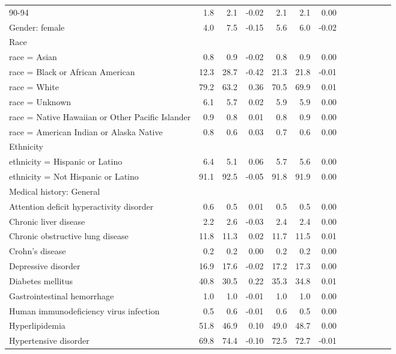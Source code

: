 \documentclass[11pt,]{article}
\begin{document}
\begin{longtable}{lrrrrrrrrrrrr}
      90-94 &  1.8 &  2.1 & -0.02 &  2.1 &  2.1 &  0.00 \\ 
  Gender: female &  4.0 &  7.5 & -0.15 &  5.6 &  6.0 & -0.02 \\ 
  Race &    &    &     &    &    &     \\ 
      race = Asian &  0.8 &  0.9 & -0.02 &  0.8 &  0.9 &  0.00 \\ 
      race = Black or African American & 12.3 & 28.7 & -0.42 & 21.3 & 21.8 & -0.01 \\ 
      race = White & 79.2 & 63.2 &  0.36 & 70.5 & 69.9 &  0.01 \\ 
      race = Unknown &  6.1 &  5.7 &  0.02 &  5.9 &  5.9 &  0.00 \\ 
      race = Native Hawaiian or Other Pacific Islander &  0.9 &  0.8 &  0.01 &  0.8 &  0.9 &  0.00 \\ 
      race = American Indian or Alaska Native &  0.8 &  0.6 &  0.03 &  0.7 &  0.6 &  0.00 \\ 
  Ethnicity &    &    &     &    &    &     \\ 
      ethnicity = Hispanic or Latino &  6.4 &  5.1 &  0.06 &  5.7 &  5.6 &  0.00 \\ 
      ethnicity = Not Hispanic or Latino & 91.1 & 92.5 & -0.05 & 91.8 & 91.9 &  0.00 \\ 
  Medical history: General &    &    &     &    &    &     \\ 
      Attention deficit hyperactivity disorder &  0.6 &  0.5 &  0.01 &  0.5 &  0.5 &  0.00 \\ 
      Chronic liver disease &  2.2 &  2.6 & -0.03 &  2.4 &  2.4 &  0.00 \\ 
      Chronic obstructive lung disease & 11.8 & 11.3 &  0.02 & 11.7 & 11.5 &  0.01 \\ 
      Crohn's disease &  0.2 &  0.2 &  0.00 &  0.2 &  0.2 &  0.00 \\ 
      Depressive disorder & 16.9 & 17.6 & -0.02 & 17.2 & 17.3 &  0.00 \\ 
      Diabetes mellitus & 40.8 & 30.5 &  0.22 & 35.3 & 34.8 &  0.01 \\ 
      Gastrointestinal hemorrhage &  1.0 &  1.0 & -0.01 &  1.0 &  1.0 &  0.00 \\ 
      Human immunodeficiency virus infection &  0.5 &  0.6 & -0.01 &  0.6 &  0.5 &  0.00 \\ 
      Hyperlipidemia & 51.8 & 46.9 &  0.10 & 49.0 & 48.7 &  0.00 \\ 
      Hypertensive disorder & 69.8 & 74.4 & -0.10 & 72.5 & 72.7 & -0.01 \\ 

\end{longtable}
\end{document}

